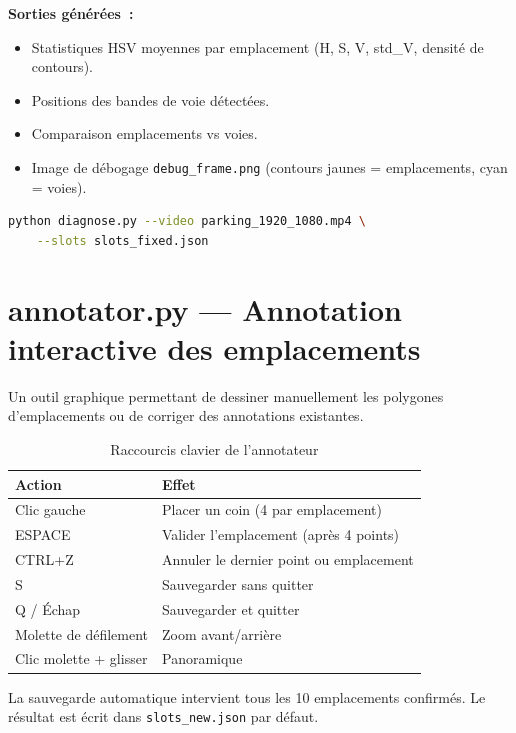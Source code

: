 \documentclass[12pt,a4paper]{report}
\begin{document}
\medskip
\noindent\textbf{Sorties générées~:}
\begin{itemize}
  \item Statistiques HSV moyennes par emplacement (H, S, V, std\_V, densité de contours).
  \item Positions des bandes de voie détectées.
  \item Comparaison emplacements vs voies.
  \item Image de débogage \texttt{debug\_frame.png} (contours jaunes = emplacements, cyan = voies).
\end{itemize}

\begin{lstlisting}[language=bash, numbers=none]
python diagnose.py --video parking_1920_1080.mp4 \
    --slots slots_fixed.json
\end{lstlisting}

\section{annotator.py — Annotation interactive des emplacements}

Un outil graphique permettant de dessiner manuellement les polygones d'emplacements ou de corriger des annotations existantes.

\begin{table}[h!]
  \centering
  \caption{Raccourcis clavier de l'annotateur}
  \begin{tabular}{ll}
    \toprule
    \textbf{Action} & \textbf{Effet} \\
    \midrule
    Clic gauche           & Placer un coin (4 par emplacement) \\
    ESPACE                & Valider l'emplacement (après 4 points) \\
    CTRL+Z                & Annuler le dernier point ou emplacement \\
    S                     & Sauvegarder sans quitter \\
    Q / Échap             & Sauvegarder et quitter \\
    Molette de défilement & Zoom avant/arrière \\
    Clic molette + glisser& Panoramique \\
    \bottomrule
  \end{tabular}
\end{table}

\noindent La sauvegarde automatique intervient tous les 10 emplacements confirmés. Le résultat est écrit dans \texttt{slots\_new.json} par défaut.
\end{document}

